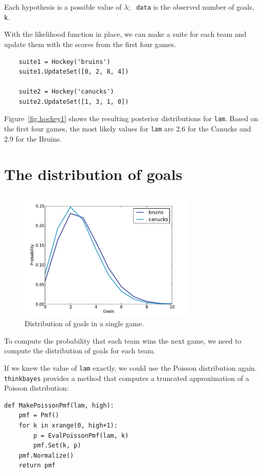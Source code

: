 \documentclass[12pt]{book}
\begin{document}
Each hypothesis is a possible value of $\lambda$;  {\tt
  data} is the observed number of goals, {\tt k}.

With the likelihood function in place, we can make a suite for each
team and update them with the scores from the first four games.

\begin{verbatim}
    suite1 = Hockey('bruins')
    suite1.UpdateSet([0, 2, 8, 4])
     
    suite2 = Hockey('canucks')
    suite2.UpdateSet([1, 3, 1, 0])
\end{verbatim}  

Figure~\ref{fig.hockey1} shows the resulting posterior distributions
for {\tt lam}.  Based on the first four games, the most likely
values for {\tt lam} are 2.6 for the Canucks and 2.9 for the Bruins.


\section{The distribution of goals}

\begin{figure}
\centerline{\includegraphics[height=2.5in]{figs/hockey2.pdf}}
\caption{Distribution of goals in a single game.}
\label{fig.hockey2}
\end{figure}

To compute the probability that each team wins the next game,
we need to compute the distribution of goals for each team.

If we knew the value of {\tt lam} exactly, we could use the
Poisson distribution again.  \verb"thinkbayes" provides a
method that computes a truncated approximation of a Poisson
distribution:

\begin{verbatim}
def MakePoissonPmf(lam, high):
    pmf = Pmf()
    for k in xrange(0, high+1):
        p = EvalPoissonPmf(lam, k)
        pmf.Set(k, p)
    pmf.Normalize()
    return pmf
\end{verbatim}  
\end{document}
